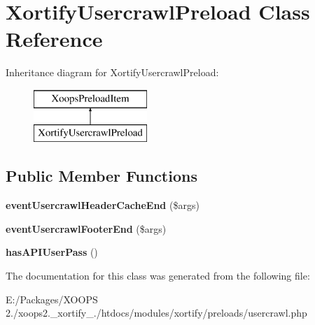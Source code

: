 \hypertarget{class_xortify_usercrawl_preload}{\section{Xortify\-Usercrawl\-Preload Class Reference}
\label{class_xortify_usercrawl_preload}
}
Inheritance diagram for Xortify\-Usercrawl\-Preload\-:\begin{figure}[H]
\begin{center}
\leavevmode
\includegraphics[height=2.000000cm]{class_xortify_usercrawl_preload}
\end{center}
\end{figure}
\subsection*{Public Member Functions}
\begin{DoxyCompactItemize}
\item 
\hypertarget{class_xortify_usercrawl_preload_a6bc37611c1b57122d9e34d19453ee500}{{\bfseries event\-Usercrawl\-Header\-Cache\-End} (\$args)}\label{class_xortify_usercrawl_preload_a6bc37611c1b57122d9e34d19453ee500}

\item 
\hypertarget{class_xortify_usercrawl_preload_a3448fe99c6b9a8fedb7156033468d3f8}{{\bfseries event\-Usercrawl\-Footer\-End} (\$args)}\label{class_xortify_usercrawl_preload_a3448fe99c6b9a8fedb7156033468d3f8}

\item 
\hypertarget{class_xortify_usercrawl_preload_a3891f6ff17df02586d169c7d18f652df}{{\bfseries has\-A\-P\-I\-User\-Pass} ()}\label{class_xortify_usercrawl_preload_a3891f6ff17df02586d169c7d18f652df}

\end{DoxyCompactItemize}


The documentation for this class was generated from the following file\-:\begin{DoxyCompactItemize}
\item 
E\-:/\-Packages/\-X\-O\-O\-P\-S 2./xoops2.\-\_\-xortify\-\_./htdocs/modules/xortify/preloads/usercrawl.\-php\end{DoxyCompactItemize}
